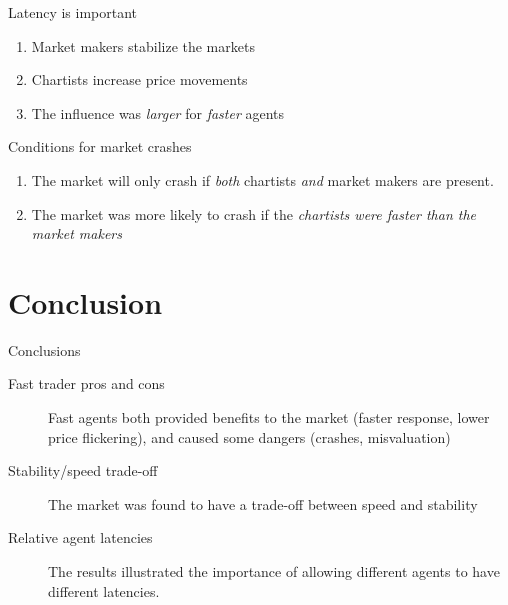 \documentclass[14pt]{beamer}
\begin{document}
\begin{frame}{Latency is important}
\begin{enumerate}
\item Market makers stabilize the markets
\item Chartists increase price movements
\item The influence was \textit{larger} for \textit{faster} agents
\end{enumerate}
\end{frame}

\begin{frame}{Conditions for market crashes}
\begin{enumerate}
\item The market will only crash if \textit{both} chartists \textit{and} market makers are present.
\item The market was more likely to crash if the \textit{chartists were faster than the market makers}
\end{enumerate}
\end{frame}


\section{Conclusion}
\begin{frame}
\tableofcontents[currentsection]
\end{frame}

\begin{frame}{Conclusions}
\begin{description}
\item[Fast trader pros and cons] Fast agents both provided benefits to the market (faster response, lower price flickering), and caused some dangers (crashes, misvaluation)
\item[Stability/speed trade-off] The market was found to have a trade-off between speed and stability
\item[Relative agent latencies] The results illustrated the importance of allowing different agents to have different latencies.
\end{description}
\end{frame}








\end{document}
